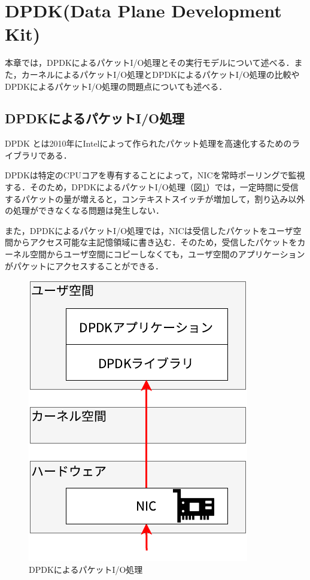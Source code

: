 \section{DPDK(Data Plane Development Kit)}
\label{sec:DPDK}
本章では，DPDKによるパケットI/O処理とその実行モデルについて述べる．また，カーネルによるパケットI/O処理とDPDKによるパケットI/O処理の比較やDPDKによるパケットI/O処理の問題点についても述べる．

\subsection{DPDKによるパケットI/O処理}
DPDK \cite{DPDK} とは2010年にIntelによって作られたパケット処理を高速化するためのライブラリである．

DPDKは特定のCPUコアを専有することによって，NICを常時ポーリングで監視する．そのため，DPDKによるパケットI/O処理（図\ref{fig:DPDKPacketIO}）では，一定時間に受信するパケットの量が増えると，コンテキストスイッチが増加して，割り込み以外の処理ができなくなる問題は発生しない．

また，DPDKによるパケットI/O処理では，NICは受信したパケットをユーザ空間からアクセス可能な主記憶領域に書き込む．そのため，受信したパケットをカーネル空間からユーザ空間にコピーしなくても，ユーザ空間のアプリケーションがパケットにアクセスすることができる．

\begin{figure}[htb]
  \centering
  \includegraphics[width=0.5\columnwidth]{pictures/DPDKPacketIO.pdf}
  \caption{DPDKによるパケットI/O処理}
  \label{fig:DPDKPacketIO}
\end{figure}

